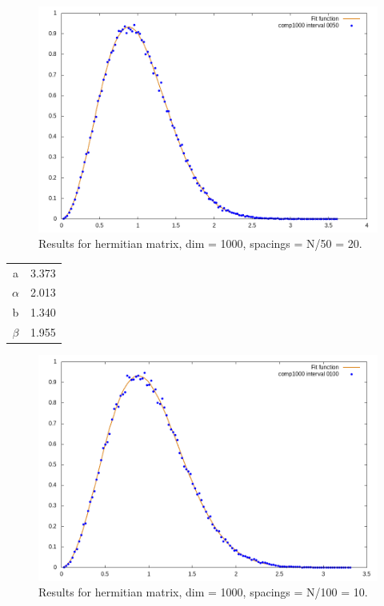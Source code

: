 \documentclass[12pt, a4paper, notitlepage]{report}
\begin{document}
\newpage

\begin{figure}[H]
	\centering
	\includegraphics[scale=0.6]{./Comp_1000/hist_interval_0020_fit.png} 
	\caption{Results for hermitian matrix, dim = 1000, spacings = N/50 = 20.}
	\label{figure_lambdas}
\end{figure}

\begin{table}[H]
	\centering
	\begin{tabular}{|c|c|}
		
		\hline
   
		a			& 3.373	\\
		$\alpha$	& 2.013	\\
		b			& 1.340	\\
		$\beta$		& 1.955	\\
		
		\hline
		
	\end{tabular}
\end{table}

\newpage

\begin{figure}[H]
	\centering
	\includegraphics[scale=0.6]{./Comp_1000/hist_interval_0010_fit.png} 
	\caption{Results for hermitian matrix, dim = 1000, spacings = N/100 = 10.}
	\label{figure_lambdas}
\end{figure}
\end{document}
